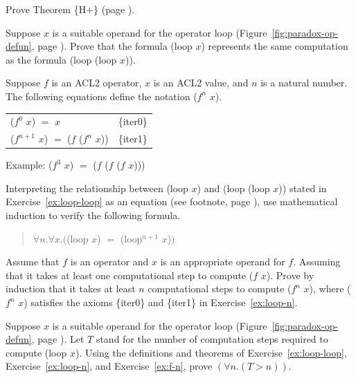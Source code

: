 \begin{ExerciseList}

\Exercise\label{ex:Hplus}
Prove Theorem \{H$+$\} (page \pageref{thm:HplusHminus}).

\Exercise \label{ex:loop-loop}
Suppose $x$ is a suitable operand for the operator \textsf{loop}
(Figure~\ref{fig:paradox-op-defun}, page \pageref{fig:paradox-op-defun}).
Prove that the formula
\textsf{(loop $x$}) represents
the same computation as the formula \textsf{(loop (loop $x$)}).

\Exercise \label{ex:loop-n}
Suppose $f$ is an ACL2 operator, $x$ is an ACL2 value,
and $n$ is a natural number.
The following equations define the notation \textsf{($f^n$ $x$)}.
\begin{center}
\begin{tabular}{ll}
\textsf{($f^0$ $x$)} $=$ $x$                             &\{iter0\} \\
\textsf{($f^{n+1}$ $x$)} $=$ \textsf{($f$ ($f^n$ $x$))}  &\{iter1\} \\
\end{tabular}
Example: \textsf{($f^3$ $x$)} $=$ \textsf{($f$ ($f$ ($f$ $x$)))}
\end{center}
Interpreting the relationship between \textsf{(loop $x$)} and \textsf{(loop (loop $x$))}
stated in Exercise~\ref{ex:loop-loop}
as an equation (see footnote, page \pageref{caveat:equality-for-loop}),
use mathematical induction to verify the following formula.
\begin{quote}
$\forall n.\forall x.($\textsf{(loop $x$)} $=$ \textsf{(loop$^{n+1}$ $x$)}$)$
\end{quote}

\Exercise \label{ex:f-n}
Assume that $f$ is an operator and $x$ is an appropriate operand for $f$.
Assuming that it takes at least one computational step to compute \textsf{($f$ $x$)}.
Prove by induction that it takes at least $n$ computational steps
to compute \textsf{($f^n$ $x$)}, where \textsf{($f^n$ $x$)} satisfies the axioms
\{iter0\} and \{iter1\} in Exercise~\ref{ex:loop-n}.

\Exercise \label{ex:loop-nonterminating}
Suppose $x$ is a suitable operand for the operator \textsf{loop}
(Figure~\ref{fig:paradox-op-defun}, page \pageref{fig:paradox-op-defun}).
Let $T$ stand for the number of computation steps required to
compute \textsf{(loop $x$)}.
Using the definitions and theorems of Exercise~\ref{ex:loop-loop},
Exercise~\ref{ex:loop-n}, and Exercise~\ref{ex:f-n},
prove $(\forall n.(T > n))$.

\end{ExerciseList}

